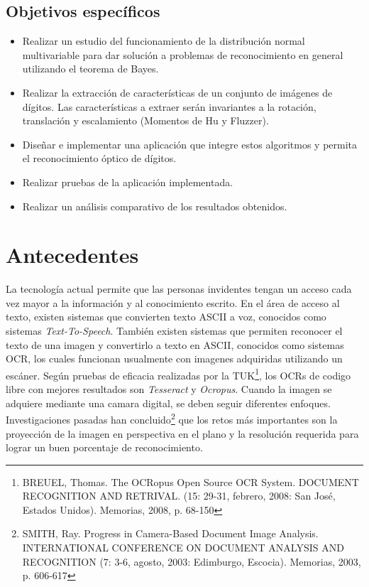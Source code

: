 \documentclass[a4paper, 11pt, oneside]{report}
\begin{document}
\subsection{Objetivos específicos}
	
	\begin{itemize}
	
	\item Realizar un estudio del funcionamiento de la distribución normal multivariable para dar solución a problemas de reconocimiento en general utilizando el teorema de Bayes.

	\item Realizar la extracción de características de un conjunto de imágenes de dígitos. Las características a extraer serán invariantes a la rotación, translación y escalamiento (Momentos de Hu y Fluzzer).
	
	\item Diseñar e implementar una aplicación que integre estos algoritmos y permita el reconocimiento óptico de dígitos.
	
	\item Realizar pruebas de la aplicación implementada.
	
	\item Realizar un análisis comparativo de los resultados obtenidos.

	\end{itemize}
	
\section {Antecedentes}

La tecnología actual permite que las personas invidentes tengan un acceso cada vez mayor a la información y al conocimiento escrito. En el área de acceso al texto, existen sistemas que convierten texto ASCII a voz, conocidos como sistemas \textit{Text-To-Speech}. También existen sistemas que permiten reconocer el texto de una imagen y convertirlo a texto en ASCII, conocidos como sistemas OCR, los cuales funcionan usualmente con imagenes adquiridas utilizando un escáner. Según pruebas de eficacia realizadas por la TUK\footnote{BREUEL, Thomas. The OCRopus Open Source OCR System. DOCUMENT RECOGNITION AND RETRIVAL. (15: 29-31, febrero, 2008: San José, Estados Unidos). Memorias, 2008, p. 68-150}, los OCRs de codigo libre con mejores resultados son \textit{Tesseract} y \textit{Ocropus}. Cuando la imagen se adquiere mediante una camara digital, se deben seguir diferentes enfoques. Investigaciones pasadas han concluido\footnote{SMITH, Ray. Progress in Camera-Based Document Image Analysis. INTERNATIONAL CONFERENCE ON DOCUMENT ANALYSIS AND RECOGNITION (7: 3-6, agosto, 2003: Edimburgo, Escocia). Memorias, 2003, p. 606-617} que los retos más importantes son la proyección de la imagen en perspectiva en el plano y la resolución requerida para lograr un buen porcentaje de reconocimiento.
\end{document}
